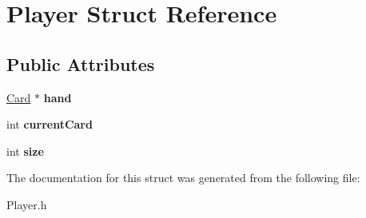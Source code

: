 \hypertarget{struct_player}{\section{Player Struct Reference}
\label{struct_player}
}
\subsection*{Public Attributes}
\begin{DoxyCompactItemize}
\item 
\hypertarget{struct_player_a76b396363177e846d8441b0e8142366e}{\hyperlink{class_card}{Card} $\ast$ {\bfseries hand}}\label{struct_player_a76b396363177e846d8441b0e8142366e}

\item 
\hypertarget{struct_player_aca9b05895c17bda88a942842b106d153}{int {\bfseries current\+Card}}\label{struct_player_aca9b05895c17bda88a942842b106d153}

\item 
\hypertarget{struct_player_a002270b4acd57124f20fb4d5d9d29717}{int {\bfseries size}}\label{struct_player_a002270b4acd57124f20fb4d5d9d29717}

\end{DoxyCompactItemize}


The documentation for this struct was generated from the following file\+:\begin{DoxyCompactItemize}
\item 
Player.\+h\end{DoxyCompactItemize}
